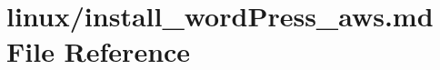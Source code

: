 \hypertarget{install__wordPress__aws_8md}{}\section{linux/install\+\_\+word\+Press\+\_\+aws.md File Reference}
\label{install__wordPress__aws_8md}
